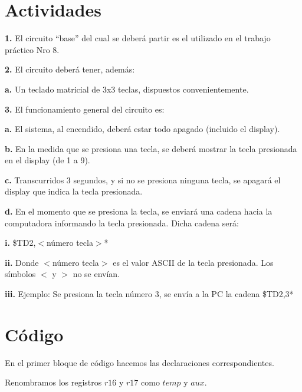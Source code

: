\documentclass[a4paper, 12pt]{article}
\begin{document}
\newpage
{}

\section{Actividades}

\textbf{1.} El circuito “base” del cual se deberá partir es el utilizado en el trabajo práctico Nro 8.

\textbf{2.} El circuito deberá tener, además:

\quad	\textbf{a.} Un teclado matricial de 3x3 teclas, dispuestos convenientemente.

\textbf{3.} El funcionamiento general del circuito es:

\quad	\textbf{a.} El sistema, al encendido, deberá estar todo apagado (incluido el display).

\quad	\textbf{b.} En la medida que se presiona una tecla, se deberá mostrar la tecla presionada en el display (de 1 a 9).

\quad	\textbf{c.} Transcurridos 3 segundos, y si no se presiona ninguna tecla, se apagará el display que indica la tecla presionada.

\quad	\textbf{d.} En el momento que se presiona la tecla, se enviará una cadena hacia la computadora informando la tecla presionada. Dicha cadena será:

\qquad	\textbf{i.} \$TD2,$<$número tecla$>$*

\qquad \textbf{ii.} Donde $<$número tecla$>$ es el valor ASCII de la tecla presionada. Los símbolos $<$ y $>$ no se envían.
	
\qquad \textbf{iii.} Ejemplo: Se presiona la tecla número 3, se envía a la PC la cadena \$TD2,3*

\section{Código}

En el primer bloque de código hacemos las declaraciones correspondientes. 

Renombramos los registros $r16$ y $r17$ como $temp$ y $aux$.
\end{document}
